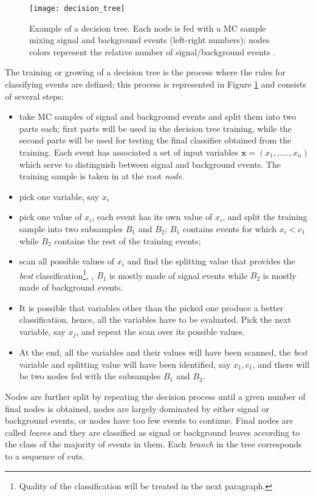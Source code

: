 \begin{figure}[!h]
  \centering
  \texttt{[image: decision\_tree]}
  \caption[Decision tree.]{Example of a decision tree. Each node is fed with a MC sample mixing signal and background events (left-right numbers); nodes colors represent the relative number of signal/background events \cite{luca}.}\label{fig:dt}
\end{figure}

The training or growing of a decision tree is the process where the rules for classifying events are defined; this process is represented in Figure \ref{fig:dt} and consists of several steps:

\begin{itemize}
\item take MC samples of signal and background events and split them into two parts each; first parts will be used in the decision tree training, while the second parts will be used for testing the final classifier obtained from the training. Each event has associated a set of input variables $\textbf{x}=(x_1,.....,x_n)$ which serve to distinguish between signal and background events. The training sample is taken in at the root \textit{node}. 
\item pick one variable, say $x_i$
\item pick one value of $x_i$, each event has its own value of $x_i$, and split the training sample into two subsamples $B_1$ and $B_2$; $B_1$ contains events for which $x_i< c_1$ while $B_2$ contains the rest of the training events;
\item scan all possible values of $x_i$ and find the splitting value that provides the \textit{best} classification\footnote{ Quality of the classification will be treated in the next paragraph.}, \ie, $B_1$ is mostly made of signal events while $B_2$ is mostly made of background events.
\item It is possible that variables other than the picked one produce a better classification, hence, all the variables have to be evaluated. Pick the next variable, say $x_j$, and repeat the scan over its possible values.
\item At the end, all the variables and their values will have been scanned, the \textit{best} variable and splitting value will have been identified, say $x_1, c_1$, and there will be two nodes fed with the subsamples $B_1$ and $B_2$. 
\end{itemize}

Nodes are further split by repeating the decision process until a given number of final nodes is obtained, nodes are largely dominated by either signal or background events, or nodes have too few events to continue. Final nodes are called \textit{leaves} and they are classified as signal or background leaves according to the class of the majority of events in them. Each \textit{branch} in the tree corresponds to a sequence of cuts. 

